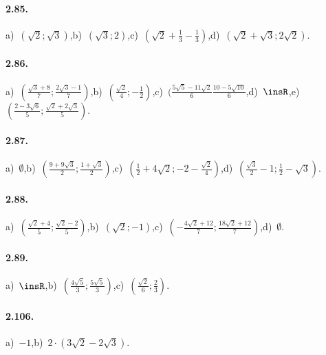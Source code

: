 \paragraph{2.85.}
a)~$(\sqrt 2;\sqrt 3)$,\quad b)~$(\sqrt 3;2)$,\quad c)~$(\sqrt 2+\frac 1 3-\frac 1 3)$,\quad d)~$(\sqrt 2+\sqrt 3;2\sqrt 2)$.

\paragraph{2.86.}
a)~$(\frac{\sqrt 3+8} 7;\frac{2\sqrt 3-1} 7)$,\quad b)~$(\frac{\sqrt 2} 4;-\frac 1 2)$,\quad c)~$(\frac{5\sqrt 5-11\sqrt 2} 6\frac{10-5\sqrt{10}} 6$,\quad d)~$\insR$,\quad e)~$(\frac{2-3\sqrt 6} 5; \frac{\sqrt 2+2\sqrt 3} 5)$.

\paragraph{2.87.}
a)~$\emptyset$,\quad b)~$(\frac{9+9\sqrt 3} 2;\frac{1+\sqrt 3} 2)$,\quad c)~$(\frac 1 2+4\sqrt 2;-2-\frac{\sqrt 2} 4)$,\quad d)~$(\frac{\sqrt 3} 2-1;\frac 1 2-\sqrt 3)$.

\paragraph{2.88.}
a)~$(\frac{\sqrt 2+4} 5;\frac{\sqrt 2-2} 5)$,\quad b)~$(\sqrt 2;-1)$,\quad c)~$(-\frac{4\sqrt 2+12} 7;\frac{18\sqrt 2+12} 7)$,\quad d)~$\emptyset$.

\paragraph{2.89.}
a)~$\insR$,\quad b)~$(\frac{4\sqrt 5} 3;\frac{5\sqrt 5} 3)$,\quad c)~$(\frac{\sqrt 2} 6;\frac 2 3)$.
\paragraph{2.106.}
a)~$-1$,\quad b)~$2\cdot (3\sqrt 2-2\sqrt 3)$.
